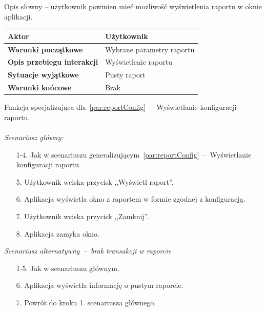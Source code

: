 Opis słowny -- użytkownik powinien mieć możliwość wyświetlenia raportu w oknie aplikacji.

\begin{longtable}{|p{5cm}|p{7cm}|}
 	\hline
	\textbf{Aktor} & Użytkownik \\
	\hline
	\textbf{Warunki początkowe} & Wybrane parametry raportu \\
	\hline
	\textbf{Opis przebiegu interakcji} & Wyświetlenie raportu \\
	\hline
	\textbf{Sytuacje wyjątkowe} & Pusty raport \\
	\hline
	\textbf{Warunki końcowe} & Brak \\
	\hline
\end{longtable}

\indent Funkcja specjalizująca dla~\ref{par:reportConfig}~--~Wyświetlanie konfiguracji raportu.\\\\
\textit{Scenariusz główny:}
\begin{enumerate}
  \item[1-4.] Jak w scenariuszu generalizującym~\ref{par:reportConfig}~--~Wyświetlanie konfiguracji raportu.
  \item[5.] Użytkownik wciska przycisk ,,Wyświetl raport''.
  \item[6.] Aplikacja wyświetla okno z raportem w formie zgodnej z konfiguracją.
  \item[7.] Użytkownik wciska przycisk ,,Zamknij''.
  \item[8.] Aplikacja zamyka okno.
\end{enumerate}

\textit{Scenariusz alternatywny~--~brak transakcji w raporcie}
\begin{enumerate}
  \item[1-5.] Jak w scenariuszu głównym.
  \item[6.] Aplikacja wyświetla informację o pustym raporcie.
  \item[7.] Powrót do kroku 1. scenariusza głównego.
\end{enumerate}


